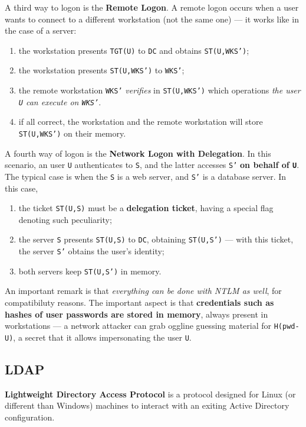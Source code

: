 \documentclass[10pt]{\classname}
\begin{document}
A third way to logon is the \textbf{Remote Logon}. A remote logon occurs when a
user wants to connect to a different workstation (not the same one) --- it works
like in the case of a server:
\begin{enumerate}
    \item the workstation presents \texttt{TGT(U)} to \texttt{DC} and obtains
        \texttt{ST(U,WKS')};
    \item the workstation presents \texttt{ST(U,WKS')} to \texttt{WKS'};
    \item the remote workstation \texttt{WKS'} \emph{verifies} in
        \texttt{ST(U,WKS')} which operations \emph{the user \texttt{U} can
        execute on \texttt{WKS'}}.
    \item if all correct, the workstation and the remote workstation will store
        \texttt{ST(U,WKS')} on their memory.
\end{enumerate}

A fourth way of logon is the \textbf{Network Logon with Delegation}. In this
scenario, an user \texttt{U} authenticates to \texttt{S}, and the latter
accesses \texttt{S'} \textbf{on behalf of \texttt{U}}. The typical case is when
the \texttt{S} is a web server, and \texttt{S'} is a database server. In this
case,
\begin{enumerate}
    \item the ticket \texttt{ST(U,S)} must be a \textbf{delegation ticket},
        having a special flag denoting such peculiarity;
    \item the server \texttt{S} presents \texttt{ST(U,S)} to \texttt{DC},
        obtaining \texttt{ST(U,S')} --- with this ticket, the server \texttt{S'}
        obtains the user's identity;
    \item both servers keep \texttt{ST(U,S')} in memory.
\end{enumerate}


An important remark is that \emph{everything can be done with NTLM as well},
for compatibiluty reasons. The important aspect is that \textbf{credentials
such as hashes of user passwords are stored in memory}, always present in
workstations --- a network attacker can grab oggline guessing material for
\texttt{H(pwd-U)}, a secret that it allows impersonating the user \texttt{U}.

\subsection{LDAP}

\textbf{Lightweight Directory Access Protocol} is a protocol designed for Linux
(or different than Windows) machines to interact with an exiting Active
Directory configuration.
\end{document}
